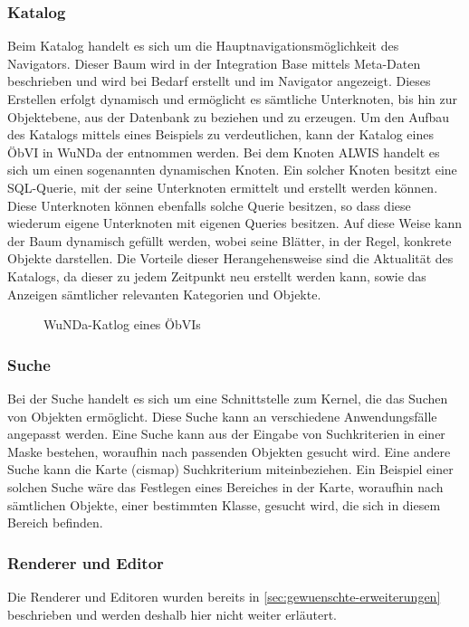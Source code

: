 \subsubsection{Katalog} \label{subsubsec:katalog}
Beim Katalog handelt es sich um die Hauptnavigationsmöglichkeit des Navigators.
Dieser Baum wird in der Integration Base mittels Meta-Daten beschrieben und wird bei Bedarf erstellt und im Navigator angezeigt.
Dieses Erstellen erfolgt dynamisch und ermöglicht es sämtliche Unterknoten, bis hin zur Objektebene, aus der Datenbank zu beziehen und zu erzeugen.
Um den Aufbau des Katalogs mittels eines Beispiels zu verdeutlichen, kann der Katalog eines \ac{ÖbVI} in \ac{WuNDa} der  entnommen werden.
Bei dem Knoten \ac{ALWIS} handelt es sich um einen sogenannten dynamischen Knoten.
Ein solcher Knoten besitzt eine SQL-Querie, mit der seine Unterknoten ermittelt und erstellt werden können.
Diese Unterknoten können ebenfalls solche Querie besitzen, so dass diese wiederum eigene Unterknoten mit eigenen Queries besitzen.
Auf diese Weise kann der Baum dynamisch gefüllt werden, wobei seine Blätter, in der Regel, konkrete Objekte darstellen.
Die Vorteile dieser Herangehensweise sind die Aktualität des Katalogs, da dieser zu jedem Zeitpunkt neu erstellt werden kann, sowie das Anzeigen sämtlicher relevanten Kategorien und Objekte.

\begin{figure}[htb]
	\centering
	\caption{WuNDa-Katlog eines ÖbVIs}
	\label{fig:katlog-oebvi}
\end{figure}

\subsubsection{Suche}
Bei der Suche handelt es sich um eine Schnittstelle zum Kernel, die das Suchen von Objekten ermöglicht.
Diese Suche kann an verschiedene Anwendungsfälle angepasst werden.
Eine Suche kann aus der Eingabe von Suchkriterien in einer Maske bestehen, woraufhin nach passenden Objekten gesucht wird.
Eine andere Suche kann die Karte (cismap) Suchkriterium miteinbeziehen. Ein Beispiel einer solchen Suche wäre das Festlegen eines Bereiches in der Karte, woraufhin nach sämtlichen Objekte, einer bestimmten Klasse, gesucht wird, die sich in diesem Bereich befinden.

\subsubsection{Renderer und Editor}
Die Renderer und Editoren wurden bereits in \autoref{sec:gewuenschte-erweiterungen} beschrieben und werden deshalb hier nicht weiter erläutert.

